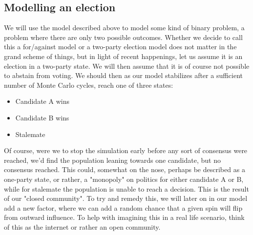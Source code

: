 \documentclass{article}
\begin{document}
\subsection{Modelling an election}
We will use the model described above to model some kind of binary problem, a problem where there are only two possible outcomes. Whether we decide to call this a for/against model or a two-party election model does not matter in the grand scheme of things, but in light of recent happenings, let us assume it is an election in a two-party state. \newline
We will then assume that it is of course not possible to abstain from voting. We should then as our model stabilizes after a sufficient number of Monte Carlo cycles, reach one of three states:
\begin{itemize}
    \item Candidate A wins
    \item Candidate B wins
    \item Stalemate
\end{itemize}
Of course, were we to stop the simulation early before any sort of consensus were reached, we'd find the population leaning towards one candidate, but no consensus reached.
\newline This could, somewhat on the nose,  perhaps be described as a one-party state, or rather, a "monopoly" on politics for either candidate A or B, while for stalemate the population is unable to reach a decision. This is the result of our "closed community". To try and remedy this, we will later on in our model add a new factor, where we can add a random chance that a given spin will flip from outward influence. To help with imagining this in a real life scenario, think of this as the internet or rather an open community.
\newpage
\end{document}
